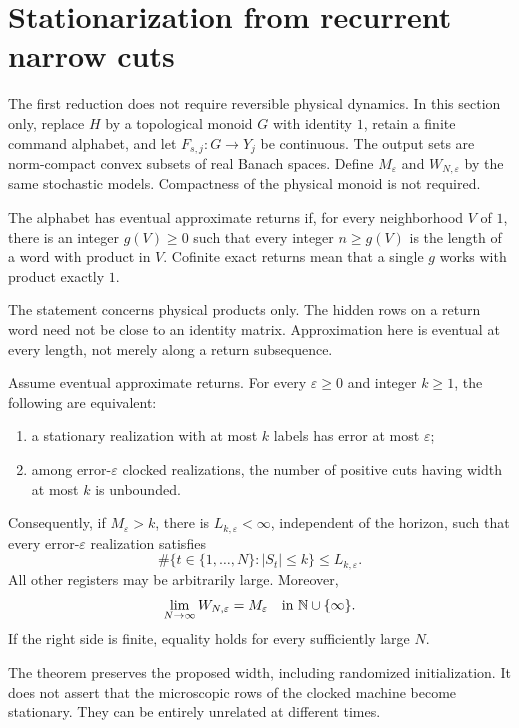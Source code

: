 \section{Stationarization from recurrent narrow cuts}\label{sec:ramsey56}
The first reduction does not require reversible physical dynamics. In this section only, replace $H$ by a topological monoid $G$ with identity $1$, retain a finite command alphabet, and let $F_{s,j}:G\to Y_j$ be continuous. The output sets are norm-compact convex subsets of real Banach spaces. Define $M_\varepsilon$ and $W_{N,\varepsilon}$ by the same stochastic models. Compactness of the physical monoid is not required.

\begin{definition}\label{def:returns56}
The alphabet has eventual approximate returns if, for every neighborhood $V$ of $1$, there is an integer $g(V)\ge0$ such that every integer $n\ge g(V)$ is the length of a word with product in $V$. Cofinite exact returns mean that a single $g$ works with product exactly $1$.
\end{definition}
The statement concerns physical products only. The hidden rows on a return word need not be close to an identity matrix. Approximation here is eventual at every length, not merely along a return subsequence.

\begin{theorem}\label{thm:stationarization56}
Assume eventual approximate returns. For every $\varepsilon\ge0$ and integer $k\ge1$, the following are equivalent:
\begin{enumerate}
\item a stationary realization with at most $k$ labels has error at most $\varepsilon$;
\item among error-$\varepsilon$ clocked realizations, the number of positive cuts having width at most $k$ is unbounded.
\end{enumerate}
Consequently, if $M_\varepsilon>k$, there is $L_{k,\varepsilon}<\infty$, independent of the horizon, such that every error-$\varepsilon$ realization satisfies
\begin{equation}\label{eq:occupation56}
 \#\{t\in\{1,\ldots,N\}:|S_t|\le k\}\le L_{k,\varepsilon}.
\end{equation}
All other registers may be arbitrarily large. Moreover,
\begin{equation}\label{eq:limitminimum56}
                  \lim_{N\to\infty}W_{N,\varepsilon}=M_\varepsilon
                  \quad\hbox{in }\mathbb N\cup\{\infty\}.
\end{equation}
If the right side is finite, equality holds for every sufficiently large $N$.
\end{theorem}
The theorem preserves the proposed width, including randomized initialization. It does not assert that the microscopic rows of the clocked machine become stationary. They can be entirely unrelated at different times.

